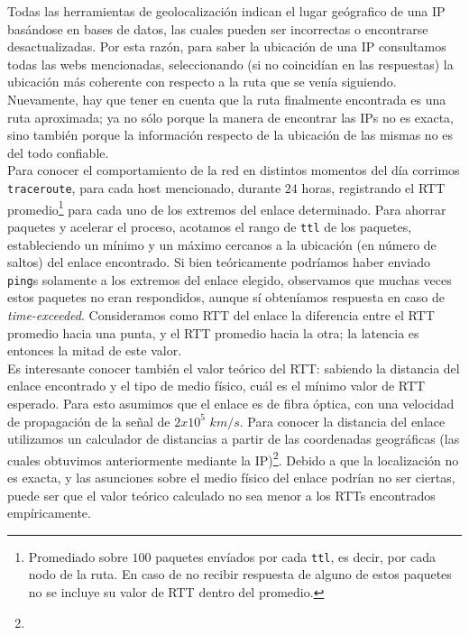  Todas las herramientas de geolocalizaci\'on indican el lugar ge\'ografico de una IP bas\'andose en bases de datos, las cuales pueden ser incorrectas o encontrarse desactualizadas. Por esta raz\'on, para saber la ubicaci\'on de una IP consultamos todas las webs mencionadas, seleccionando (si no coincid\'ian en las respuestas) la ubicaci\'on m\'as coherente con respecto a la ruta que se ven\'ia siguiendo. Nuevamente, hay que tener en cuenta que la ruta finalmente encontrada es una ruta aproximada; ya no s\'olo porque la manera de encontrar las IPs no es exacta, sino tambi\'en porque la informaci\'on respecto de la ubicaci\'on de las mismas no es del todo confiable. \\
 
 
 Para conocer el comportamiento de la red en distintos momentos del d\'ia corrimos \texttt{traceroute}, para cada host mencionado, durante $24$ horas, registrando el RTT promedio\footnote{Promediado sobre $100$ paquetes env\'iados por cada \texttt{ttl}, es decir, por cada nodo de la ruta. En caso de no recibir respuesta de alguno de estos paquetes no se incluye su valor de RTT dentro del promedio.} para cada uno de los extremos del enlace determinado. Para ahorrar paquetes y acelerar el proceso, acotamos el rango de \texttt{ttl} de los paquetes, estableciendo un m\'inimo y un m\'aximo cercanos a la ubicaci\'on (en n\'umero de saltos) del enlace encontrado. Si bien teóricamente podríamos haber enviado \texttt{ping}s solamente a los extremos del enlace elegido, observamos que muchas veces estos paquetes no eran respondidos, aunque sí obteníamos respuesta en caso de \emph{time-exceeded}. Consideramos como RTT del enlace la diferencia entre el RTT promedio hacia una punta, y el RTT promedio hacia la otra; la 
latencia es entonces la mitad de este valor.\\

Es interesante conocer tambi\'en el valor te\'orico del RTT: sabiendo la distancia del enlace encontrado y el tipo de medio f\'isico, cu\'al es el m\'inimo valor de RTT esperado. Para esto asumimos que el enlace es de fibra \'optica, con una velocidad de propagaci\'on de la se\~nal de $2x10^5$ $km/s$. Para conocer la distancia del enlace utilizamos un calculador de distancias a partir de las coordenadas geogr\'aficas (las cuales obtuvimos anteriormente mediante la IP)\footnote{}. Debido a que la localizaci\'on no es exacta, y las asunciones sobre el medio f\'isico del enlace podr\'ian no ser ciertas, puede ser que el valor te\'orico calculado no sea menor a los RTTs encontrados emp\'iricamente.\\

